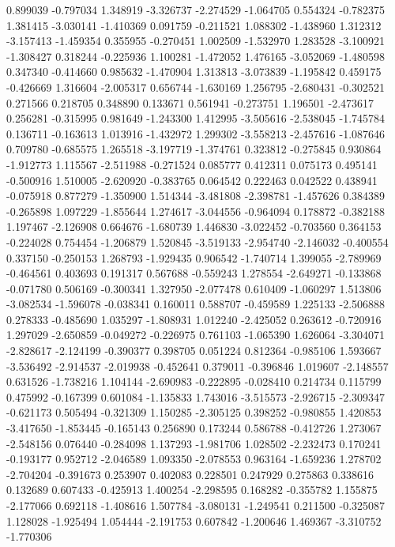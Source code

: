 0.899039
-0.797034
1.348919
-3.326737
-2.274529
-1.064705
0.554324
-0.782375
1.381415
-3.030141
-1.410369
0.091759
-0.211521
1.088302
-1.438960
1.312312
-3.157413
-1.459354
0.355955
-0.270451
1.002509
-1.532970
1.283528
-3.100921
-1.308427
0.318244
-0.225936
1.100281
-1.472052
1.476165
-3.052069
-1.480598
0.347340
-0.414660
0.985632
-1.470904
1.313813
-3.073839
-1.195842
0.459175
-0.426669
1.316604
-2.005317
0.656744
-1.630169
1.256795
-2.680431
-0.302521
0.271566
0.218705
0.348890
0.133671
0.561941
-0.273751
1.196501
-2.473617
0.256281
-0.315995
0.981649
-1.243300
1.412995
-3.505616
-2.538045
-1.745784
0.136711
-0.163613
1.013916
-1.432972
1.299302
-3.558213
-2.457616
-1.087646
0.709780
-0.685575
1.265518
-3.197719
-1.374761
0.323812
-0.275845
0.930864
-1.912773
1.115567
-2.511988
-0.271524
0.085777
0.412311
0.075173
0.495141
-0.500916
1.510005
-2.620920
-0.383765
0.064542
0.222463
0.042522
0.438941
-0.075918
0.877279
-1.350900
1.514344
-3.481808
-2.398781
-1.457626
0.384389
-0.265898
1.097229
-1.855644
1.274617
-3.044556
-0.964094
0.178872
-0.382188
1.197467
-2.126908
0.664676
-1.680739
1.446830
-3.022452
-0.703560
0.364153
-0.224028
0.754454
-1.206879
1.520845
-3.519133
-2.954740
-2.146032
-0.400554
0.337150
-0.250153
1.268793
-1.929435
0.906542
-1.740714
1.399055
-2.789969
-0.464561
0.403693
0.191317
0.567688
-0.559243
1.278554
-2.649271
-0.133868
-0.071780
0.506169
-0.300341
1.327950
-2.077478
0.610409
-1.060297
1.513806
-3.082534
-1.596078
-0.038341
0.160011
0.588707
-0.459589
1.225133
-2.506888
0.278333
-0.485690
1.035297
-1.808931
1.012240
-2.425052
0.263612
-0.720916
1.297029
-2.650859
-0.049272
-0.226975
0.761103
-1.065390
1.626064
-3.304071
-2.828617
-2.124199
-0.390377
0.398705
0.051224
0.812364
-0.985106
1.593667
-3.536492
-2.914537
-2.019938
-0.452641
0.379011
-0.396846
1.019607
-2.148557
0.631526
-1.738216
1.104144
-2.690983
-0.222895
-0.028410
0.214734
0.115799
0.475992
-0.167399
0.601084
-1.135833
1.743016
-3.515573
-2.926715
-2.309347
-0.621173
0.505494
-0.321309
1.150285
-2.305125
0.398252
-0.980855
1.420853
-3.417650
-1.853445
-0.165143
0.256890
0.173244
0.586788
-0.412726
1.273067
-2.548156
0.076440
-0.284098
1.137293
-1.981706
1.028502
-2.232473
0.170241
-0.193177
0.952712
-2.046589
1.093350
-2.078553
0.963164
-1.659236
1.278702
-2.704204
-0.391673
0.253907
0.402083
0.228501
0.247929
0.275863
0.338616
0.132689
0.607433
-0.425913
1.400254
-2.298595
0.168282
-0.355782
1.155875
-2.177066
0.692118
-1.408616
1.507784
-3.080131
-1.249541
0.211500
-0.325087
1.128028
-1.925494
1.054444
-2.191753
0.607842
-1.200646
1.469367
-3.310752
-1.770306
